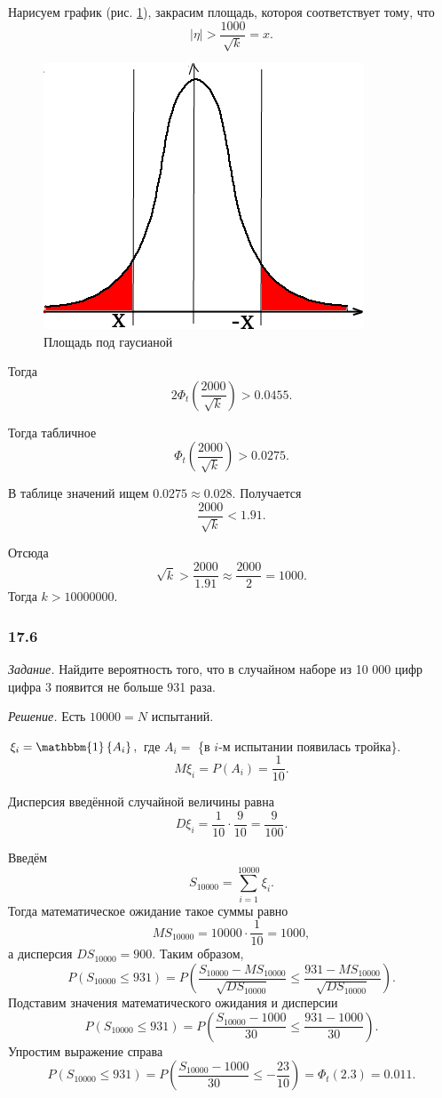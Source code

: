 Нарисуем график (рис. \ref{fig:175}), закрасим площадь, котороя соответствует тому, что
$$ \left| \eta \right| >
  \frac{1000}{ \sqrt{k}} =
  x.$$

\begin{figure}[h!]
  \centering
  \includegraphics[width=.4\textwidth]{./pictures/17_5.png}
  \caption{Площадь под гаусианой}
  \label{fig:175}
\end{figure}

Тогда
$$2 \Phi_t \left( \frac{2000}{ \sqrt{k}} \right) >
  0.0455.$$

Тогда табличное
$$ \Phi_t \left( \frac{2000}{ \sqrt{k}} \right) >
  0.0275.$$

В таблице значений ищем $0.0275 \approx 0.028$.
Получается
$$ \frac{2000}{ \sqrt{k}} <
  1.91.$$

Отсюда
$$ \sqrt{k} >
  \frac{2000}{1.91} \approx
  \frac{2000}{2} =
  1000.$$
Тогда $k > 10000000$.

\subsubsection*{17.6}

\textit{Задание.}
Найдите вероятность того, что в случайном наборе из 10 000 цифр цифра 3 появится не больше 931 раза.

\textit{Решение.} Есть $10000 = N$ испытаний.

$ \xi_i = \mathbbm{1} \left\{ A_i \right\},$
где $A_i =$ \{в $i$-м испытании появилась тройка\}.
$$M \xi_i =
  P \left( A_i \right) =
  \frac{1}{10}.$$

Дисперсия введённой случайной величины равна
$$D \xi_i =
  \frac{1}{10} \cdot \frac{9}{10} =
  \frac{9}{100}.$$

Введём
$$S_{10000} =
  \sum \limits_{i = 1}^{10000} \xi_i.$$
Тогда математическое ожидание такое суммы равно
$$MS_{10000} =
  10000 \cdot \frac{1}{10} =
  1000,$$
а дисперсия $DS_{10000} = 900$.
Таким образом,
$$P \left( S_{10000} \leq 931 \right) =
  P \left(
    \frac{S_{10000} - MS_{10000}}{ \sqrt{DS_{10000}}} \leq \frac{931 - MS_{10000}}{ \sqrt{DS_{10000}}}
  \right).$$
Подставим значения математического ожидания и дисперсии
$$P \left( S_{10000} \leq 931 \right) =
  P \left( \frac{S_{10000} - 1000}{30} \leq \frac{931 - 1000}{30} \right).$$
Упростим выражение справа
$$P \left( S_{10000} \leq 931 \right) =
  P \left( \frac{S_{10000} - 1000}{30} \leq -\frac{23}{10} \right) =
  \Phi_t \left( 2.3 \right) =
  0.011.$$

